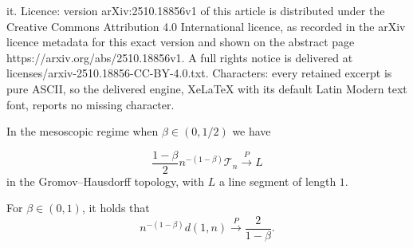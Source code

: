 \documentclass[10pt,a4paper]{amsart}
\newcommand{\convp}{\stackrel{P}{\longrightarrow}}
\begin{document}
it. Licence: version arXiv:2510.18856v1 of this article is distributed under the Creative Commons Attribution 4.0 International licence, as recorded in the arXiv licence metadata for this exact version and shown on the abstract page https://arxiv.org/abs/2510.18856v1. A full rights notice is delivered at licenses/arxiv-2510.18856-CC-BY-4.0.txt. Characters: every retained excerpt is pure ASCII, so the delivered engine, XeLaTeX with its default Latin Modern text font, reports no missing character.
\begin{thm}\label{thm:ghp_meso}
In the mesoscopic regime when $\beta\in (0,1/2)$ we have 

\[\frac{1-\beta}{2} n^{-(1-\beta)}\mathcal{T}_n \convp L  \]
in the Gromov--Hausdorff topology, with $L$ a line segment of length $1$. 
\end{thm}

\begin{prop}\label{prop:dist_limit}
For $\beta \in (0,1)$, it holds that 
\[n^{-(1-\beta)} d(1,n)\convp \frac{2}{1-\beta}. \]
\end{prop}
\end{document}
